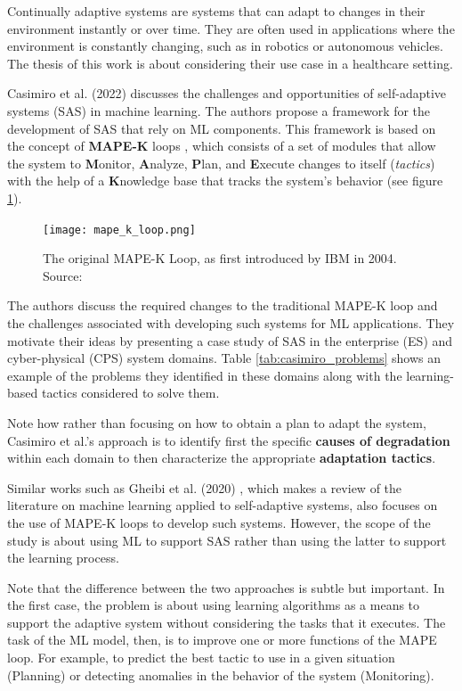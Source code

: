 \documentclass[../main.tex]{subfiles}
\begin{document}
    Continually adaptive systems are systems that can adapt to changes in their environment instantly or over time. They are often used in applications where the environment is constantly changing, such as in robotics or autonomous vehicles. The thesis of this work is about considering their use case in a healthcare setting. 

    Casimiro et al. (2022) discusses the challenges and opportunities of self-adaptive systems (SAS) in machine learning. The authors propose a framework for the development of SAS that rely on ML components. This framework is based on the concept of \textbf{MAPE-K} loops \cite{kephartVisionAutonomicComputing2003}, which consists of a set of modules that allow the system to \textbf{M}onitor, \textbf{A}nalyze, \textbf{P}lan, and \textbf{E}xecute changes to itself (\textit{tactics}) with the help of a \textbf{K}nowledge base that tracks the system's behavior (see figure \ref{fig:mape-k}).

    \begin{figure}[h]
        \centering
        \texttt{[image: mape\_k\_loop.png]}
        \caption{The original MAPE-K Loop, as first introduced by IBM in 2004. Source: \cite{redbooks_practical_2004}}
        \label{fig:mape-k}
    \end{figure}
    
    The authors discuss the required changes to the traditional MAPE-K loop and the challenges associated with developing such systems for ML applications. They motivate their ideas by presenting a case study of SAS in the enterprise (ES) and cyber-physical (CPS) system domains. Table \ref{tab:casimiro_problems} shows an example of the problems they identified in these domains along with the learning-based tactics considered to solve them.
    
    Note how rather than focusing on how to obtain a plan to adapt the system, Casimiro et al.'s approach is to identify first the specific \textbf{causes of degradation} within each domain to then characterize the appropriate \textbf{adaptation tactics}. 

    Similar works such as Gheibi et al. (2020) \cite{gheibiApplyingMachineLearning2020}, which makes a review of the literature on machine learning applied to self-adaptive systems, also focuses on the use of MAPE-K loops to develop such systems. However, the scope of the study is about using ML to support SAS rather than using the latter to support the learning process.
    
    Note that the difference between the two approaches is subtle but important. In the first case, the problem is about using learning algorithms as a means to support the adaptive system without considering the tasks that it executes. The task of the ML model, then, is to improve one or more functions of the MAPE loop. For example, to predict the best tactic to use in a given situation (Planning) or detecting anomalies in the behavior of the system (Monitoring).
\end{document}
